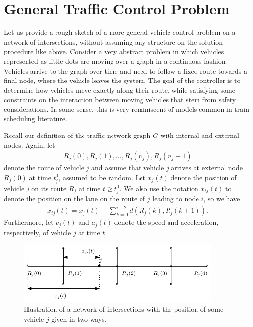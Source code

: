 \documentclass{article}
\theoremstyle{definition}
\theoremstyle{plain}
\begin{document}
\section{General Traffic Control Problem}
\label{sec:general}

Let us provide a rough sketch of a more general vehicle control problem on a
network of intersections, without assuming any structure on the solution
procedure like above. Consider a very abstract problem in which vehicles
represented as little dots are moving over a graph in a continuous fashion.
Vehicles arrive to the graph over time and need to follow a fixed route towards
a final node, where the vehicle leaves the system. The goal of the controller is
to determine how vehicles move exactly along their route, while satisfying some
constraints on the interaction between moving vehicles that stem from safety
considerations. In some sense, this is very reminiscent of models common in
train scheduling literature.

Recall our definition of the traffic network graph $G$ with internal and
external nodes. Again, let
\begin{align*}
  R_{j}(0), R_{j}(1), \dots, R_{j}(n_{j}), R_{j}(n_{j}+1)
\end{align*}
denote the route of vehicle $j$ and assume that vehicle $j$ arrives at external
node $R_{j}(0)$ at time $t_{j}^{0}$, assumed to be random. Let $x_{j}(t)$ denote
the position of vehicle $j$ on its route $R_{j}$ at time $t \geq t_{j}^{0}$. We
also use the notation $x_{ij}(t)$ to denote the position on the lane on the
route of $j$ leading to node $i$, so we have
\begin{align}
  x_{ij}(t) = x_{j}(t) - \sum_{k=0}^{i-2} d(R_{j}(k), R_{j}(k+1)) .
\end{align}
Furthermore, let $v_{j}(t)$ and $a_{j}(t)$ denote the speed and acceleration,
respectively, of vehicle $j$ at time $t$.

\begin{figure}[b]
  \centering
  \includegraphics[width=0.9\textwidth]{figures/general_traffic_model.pdf}
  \caption{Illustration of a network of intersections with the position of some
    vehicle $j$ given in two ways.}
  \label{fig:general-model}
\end{figure}
\end{document}

